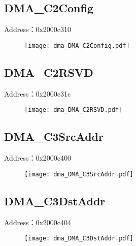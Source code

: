 \subsection{DMA\_C2Config}
\label{dma-DMA-C2Config}
Address：0x2000c310
 \begin{figure}[H]
\texttt{[image: dma\_DMA\_C2Config.pdf]}
\end{figure}

\subsection{DMA\_C2RSVD}
\label{dma-DMA-C2RSVD}
Address：0x2000c31c
 \begin{figure}[H]
\texttt{[image: dma\_DMA\_C2RSVD.pdf]}
\end{figure}

\subsection{DMA\_C3SrcAddr}
\label{dma-DMA-C3SrcAddr}
Address：0x2000c400
 \begin{figure}[H]
\texttt{[image: dma\_DMA\_C3SrcAddr.pdf]}
\end{figure}

\subsection{DMA\_C3DstAddr}
\label{dma-DMA-C3DstAddr}
Address：0x2000c404
 \begin{figure}[H]
\texttt{[image: dma\_DMA\_C3DstAddr.pdf]}
\end{figure}

